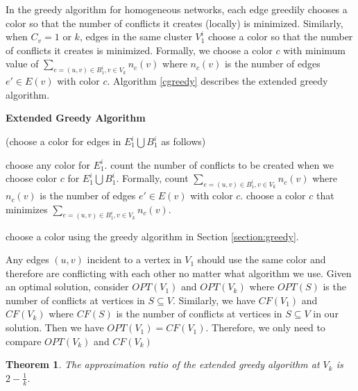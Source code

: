 \documentclass[titlepage, 11pt]{article}
\newtheorem{theorem}{Theorem}
\begin{document}
In the greedy algorithm for homogeneous networks,
each edge greedily chooses a color so that
the number of conflicts it creates (locally) is minimized.
Similarly, when $C_v = 1$ or $k$, edges in the same cluster $V_1^i$
choose a color  so that the number of conflicts it creates is minimized.
Formally, we choose a color $c$ with minimum value of 
$\sum_{e = (u, v) \in B^i_1, v \in V_k} n_c(v)$ where
$n_c(v)$ is the number of edges $e' \in E(v)$ with color $c$. Algorithm \ref{cgreedy} describes the extended greedy algorithm.

\begin{algorithm}[ht]
\caption{\bf  Extended Greedy Algorithm}
\label{cgreedy}
\begin{algorithmic}
	\STATE (choose a color for edges in $E^i_1 \bigcup B^i_1$ as follows)

	\STATE choose any color for $E^i_1$.
\ELSE 
	\STATE count the number of conflicts to be created 
when we choose color $c$ for $E^i_1 \bigcup B^i_1$.
Formally, count $\sum_{e = (u, v) \in B^i_1, v \in V_k} n_c(v)$ where
$n_c(v)$ is the number of edges $e' \in E(v)$ 
with color $c$.
\ENDFOR
\STATE choose a color $c$ 
that  minimizes $\sum_{e = (u, v) \in B^i_1, v \in V_k} n_c(v)$. 
\ENDIF
\ENDFOR

\STATE choose a color using the greedy algorithm
in Section \ref{section:greedy}.
\ENDFOR
\end{algorithmic}
\end{algorithm}


Any edges $(u, v)$  incident to a vertex in $V_1$
should use the same color and therefore are conflicting with each other no matter what algorithm we use.
Given an optimal solution, consider $OPT(V_1)$ and $OPT(V_k)$
where $OPT(S)$ is the number of conflicts at vertices in $S \subseteq V$.
Similarly, we have $CF(V_1)$ and $CF(V_k)$ where
$CF(S)$ is the number of conflicts at vertices in $S \subseteq V$ in our solution.
Then we have $OPT(V_1) = CF(V_1)$. Therefore, we only need to
compare $OPT(V_k)$ and $CF(V_k)$

\begin{theorem}
\iffalse
The number of conflicts created by the extended greedy algorithm 
at $V_k$ is at most $(2-1/k) OPT(V_k) + (1 - 1/k) |E(V_k)|$
where $|E(V_k)|$ is $\sum_{v \in V_k }  \frac{d_v}{2}$. 
\fi
The approximation ratio of the extended greedy algorithm 
at $V_k$ is  $2 - \frac{1}{k}$.
\label{th:1k-approx}
\end{theorem}
\end{document}

